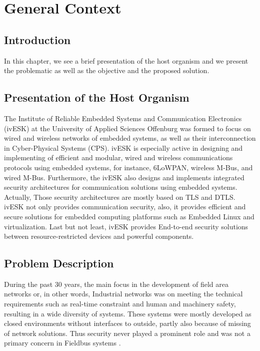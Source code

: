 %
%
%
%
%

\chapter{General Context}

\section*{Introduction}

In this chapter, we see a brief presentation of the host organism and we present the problematic as
well as the objective and the proposed solution.

\section{Presentation of the Host Organism}

The Institute of Reliable Embedded Systems and Communication Electronics (\ac{ivESK})
at the University of Applied Sciences Offenburg was formed to focus on
wired and wireless networks of embedded systems, as well as their interconnection in Cyber-Physical Systems (CPS).
\ac{ivESK} is especially active in designing and implementing of efficient and modular, wired and wireless communications protocols using embedded systems,
for instance, 6LoWPAN, wireless M-Bus, and wired M-Bus. Furthermore, the \ac{ivESK} also designs and implements
integrated security architectures for communication solutions using embedded systems. Actually, Those security architectures
are mostly based on \ac{TLS} and \ac{DTLS}. \ac{ivESK} not only provides communication security, also,
it provides efficient and secure solutions for embedded computing platforms such as Embedded Linux and virtualization.
Last but not least, \ac{ivESK} provides End-to-end security solutions between resource-restricted devices and powerful components.

\section{Problem Description}
During the past 30 years, the main focus in the development of field area networks or, in other words, Industrial networks was on meeting the technical requirements such as real-time constraint and human and machinery safety, resulting in a wide diversity
of systems. These systems were mostly developed as closed environments without interfaces to
outside, partly also because of missing of network solutions. Thus security never played a
prominent role and was not a primary concern in Fieldbus systems \cite{zurawski2014industrial}.

